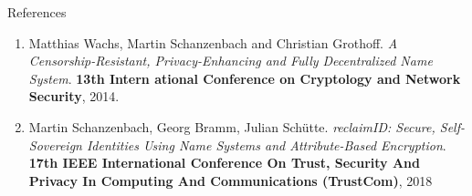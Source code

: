 \documentclass[aspectratio=169]{beamer}
\begin{document}
\begin{frame}{References}
  \centering
  {\small
  \begin{enumerate}
    \item {Matthias Wachs, Martin Schanzenbach and Christian Grothoff. {\em A Censorship-Resistant, Privacy-Enhancing and Fully Decentralized Name System}. {\bf 13th Intern
      ational Conference on Cryptology and Network Security}, 2014.}
    \item {Martin Schanzenbach, Georg Bramm, Julian Schütte. {\em reclaimID: Secure, Self-Sovereign Identities Using Name Systems and Attribute-Based Encryption}. {\bf 17th
      IEEE International Conference On Trust, Security And Privacy In Computing And Communications (TrustCom)}, 2018}
  \end{enumerate}
  }
\end{frame}



%
%
%
%
%
\end{document}
